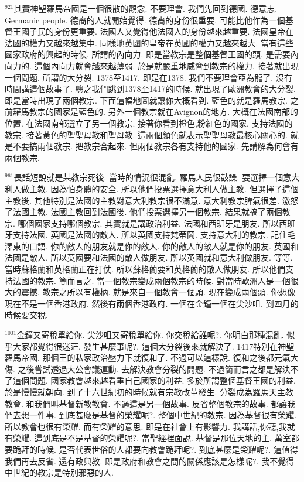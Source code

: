 \documentclass{book}
\begin{document}
$^{921}$其實神聖羅馬帝國是一個很散的觀念.
不要理會.
我們先回到德國.
德意志.
Germanic people.
德裔的人就開始覺得.
德裔的身份很重要.
可能比他作為一個基督王國子民的身份更重要.
法國人又覺得他法國人的身份越來越重要.
法國皇帝在法國的權力又越來越集中.
同樣地英國的皇帝在英國的權力又越來越大.
當有這些國家政府的興起的時候.
所謂的內向力.
即是當教宗是整個基督王國的頭.
是需要內向力的.
這個內向力就會越來越薄弱.
於是就嚴重地威脅到教宗的權力.
接著就出現一個問題.
所謂的大分裂.
1378至1417.
即是在1378.
我們不要理會亞為龍了.
沒有時間講這個故事了.
總之我們跳到1378至1417的時候.
就出現了歐洲教會的大分裂.
即是當時出現了兩個教宗.
下面這幅地圖就讓你大概看到.
藍色的就是羅馬教宗.
之前羅馬教宗的國家是藍色的.
另外一個教宗就在Avignon的地方.
大概在法國南部的位置.
在法國南部選立了另一個教宗.
接著你看到橙色,粉紅色的國家.
支持法國的教宗.
接著黃色的聖聖母教和聖母教.
這兩個顏色就表示聖聖母教最核心關心的.
就是不要搞兩個教宗.
把教宗合起來.
但兩個教宗各有支持他的國家.
先講解為何會有兩個教宗.

$^{961}$長話短說就是某教宗死後.
當時的情況很混亂.
羅馬人民很鼓譟.
要選擇一個意大利人做主教.
因為怕身體的安全.
所以他們投票選擇意大利人做主教.
但選擇了這個主教後.
其他特別是法國的主教對意大利教宗很不滿意.
意大利教宗脾氣很差.
激怒了法國主教.
法國主教回到法國後.
他們投票選擇另一個教宗.
結果就搞了兩個教宗.
哪個國家支持哪個教宗.
其實就是講政治利益.
法國和西班牙是朋友.
所以西班牙支持法國.
英國是法國的敵人.
所以英國支持梵蒂岡.
支持意大利的教宗.
記住毛澤東的口語.
你的敵人的朋友就是你的敵人.
你的敵人的敵人就是你的朋友.
英國和法國是敵人.
所以英國要和法國的敵人做朋友.
所以英國就和意大利做朋友.
等等.
當時蘇格蘭和英格蘭正在打仗.
所以蘇格蘭要和英格蘭的敵人做朋友.
所以他們支持法國的教宗.
簡而言之.
當一個教宗變成兩個教宗的時候.
對當時歐洲人是一個很大的震撼.
教宗之所以有權柄.
就是來自一個教會一個頭.
現在變成兩個頭.
你想像現在不是一個香港政府.
然後有兩個香港政府.
一個在金鐘一個在尖沙咀.
到四月的時候要交稅.

$^{1001}$金鐘又寄稅單給你.
尖沙咀又寄稅單給你.
你交稅給誰呢?.
你明白那種混亂.
似乎大家都覺得很迷茫.
發生甚麼事呢?.
這個大分裂後來就解決了.
1417特別在神聖羅馬帝國.
那個王的私家政治壓力下就復和了.
不過可以這樣說.
復和之後都元氣大傷.
之後嘗試透過大公會議運動.
去解決教會分裂的問題.
不過簡而言之都是解決不了這個問題.
國家教會越來越看重自己國家的利益.
多於所謂整個基督王國的利益.
於是慢慢就朝向.
到了十六世紀初的時候就有宗教改革發生.
分裂成為羅馬天主教教會.
和我們叫基督新教教會.
不過這是另一個故事.
反省整個教宗的故事.
都讓我們去想一件事.
到底甚麼是基督的榮耀呢?.
整個中世紀的教宗.
因為基督很有榮耀.
所以教會也很有榮耀.
而有榮耀的意思.
即是在社會上有影響力.
我講話,你聽,我就有榮耀.
這到底是不是基督的榮耀呢?.
當聖經裡面說.
基督是那位天地的主.
萬室都要跪拜的時候.
是否代表世俗的人都要向教會跪拜呢?.
到底甚麼是榮耀呢?.
這值得我們再去反省.
還有政與教.
即是政府和教會之間的關係應該是怎樣呢?.
我不覺得中世紀的教宗是特別邪惡的人.
\end{document}

